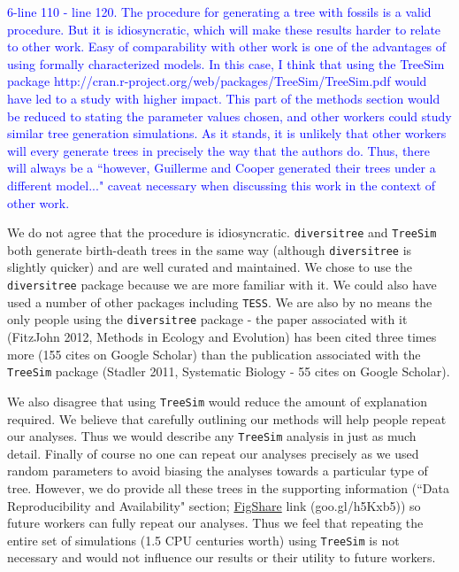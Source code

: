 \documentclass[11pt]{letter}
\begin{document}
\begin{letter}{}

\textcolor{blue}{6-line 110 - line 120. The procedure for generating a tree with fossils is a valid procedure. But it is idiosyncratic, which will make these results harder to relate to other work. Easy of comparability with other work is one of the advantages of using formally characterized models. In this case, I think that using the TreeSim package http://cran.r-project.org/web/packages/TreeSim/TreeSim.pdf would have led to a study with higher impact. This part of the methods section would be reduced to stating the parameter values chosen, and other workers could study similar tree generation simulations. As it stands, it is unlikely that other workers will every generate trees in precisely the way that the authors do. Thus, there will always be a ``however, Guillerme and Cooper generated their trees under a different model..." caveat necessary when discussing this work in the context of other work.}

We do not agree that the procedure is idiosyncratic. \texttt{diversitree} and \texttt{TreeSim} both generate birth-death trees in the same way (although \texttt{diversitree} is slightly quicker) and are well curated and maintained. We chose to use the \texttt{diversitree} package because we are more familiar with it. We could also have used a number of other packages including \texttt{TESS}. We are also by no means the only people using the \texttt{diversitree} package - the paper associated with it (FitzJohn 2012, Methods in Ecology and Evolution) has been cited three times more (155 cites on Google Scholar) than the publication associated with the \texttt{TreeSim} package (Stadler 2011, Systematic Biology - 55 cites on Google Scholar).

We also disagree that using \texttt{TreeSim} would reduce the amount of explanation required. We believe that carefully outlining our methods will help people repeat our analyses. Thus we would describe any \texttt{TreeSim} analysis in just as much detail.
Finally of course no one can repeat our analyses precisely as we used random parameters to avoid biasing the analyses towards a particular type of tree. However, we do provide all these trees in the supporting information (``Data Reproducibility and Availability" section; \href{http://figshare.com/articles/Effect_of_missing_data_on_topological_inference_using_a_total_evidence_approach/1306861}{FigShare} link (goo.gl/h5Kxb5)) so future workers can fully repeat our analyses. Thus we feel that repeating the entire set of simulations (1.5 CPU centuries worth) using \texttt{TreeSim} is not necessary and would not influence our results or their utility to future workers.


\end{letter}
\end{document}
